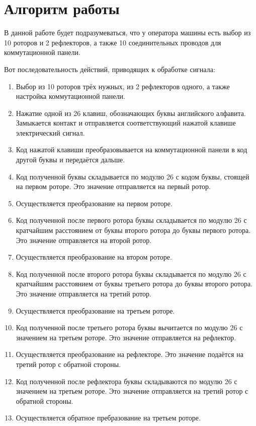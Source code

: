 \section{Алгоритм работы}

В данной работе будет подразумеваться, что у оператора машины есть выбор из 10 роторов и 2 рефлекторов, а также 10 соединительных проводов для коммутационной панели.

Вот последовательность действий, приводящих к обработке сигнала:
\begin{enumerate}
	\item Выбор из 10 роторов трёх нужных, из 2 рефлекторов одного, а также настройка коммутационной панели.
	\item Нажатие одной из 26 клавиш, обозначающих буквы английского алфавита. Замыкается контакт и отправляется соответствующий нажатой клавише электрический сигнал.
	\item Код нажатой клавиши преобразовывается на коммутационной панели в код другой буквы и передаётся дальше.
	\item Код полученной буквы складывается по модулю 26 с кодом буквы, стоящей на первом роторе. Это значение отправляется на первый ротор.
	\item Осуществляется преобразование на первом роторе.
	\item Код полученной после первого ротора буквы складывается по модулю 26 с кратчайшим расстоянием от буквы второго ротора до буквы первого ротора. Это значение отправляется на второй ротор.
	\item Осуществляется преобразование на втором роторе.
	\item Код полученной после второго ротора буквы складывается по модулю 26 с кратчайшим расстоянием от буквы третьего ротора до буквы второго ротора. Это значение отправляется на третий ротор.
	\item Осуществляется преобразование на третьем роторе.
	\item Код полученной после третьего ротора буквы вычитается по модулю 26 с значением на третьем роторе. Это значение отправляется на рефлектор.
	\item Осуществляется преобразование на рефлекторе. Это значение подаётся на третий ротор с обратной стороны.
	\item Код полученной после рефлектора буквы складываются по модулю 26 с значением на третьем роторе. Это значение отправляется на третий ротор с обратной стороны.
	\item Осуществляется обратное пребразование на третьем роторе.

\end{enumerate}
